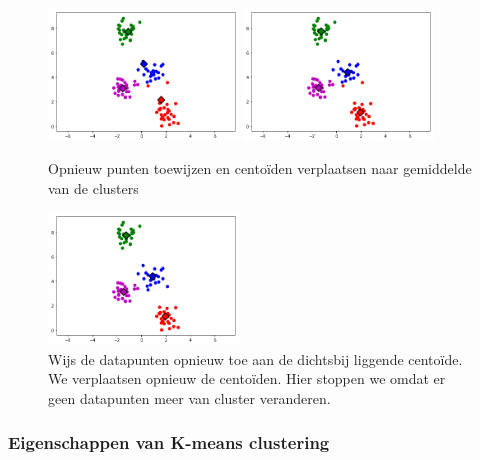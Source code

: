 \documentclass{article}
\begin{document}
\begin{figure}[H]
    \centering
    \includegraphics[width=0.45\textwidth]{k-means-7.png}
    \includegraphics[width=0.45\textwidth]{k-means-8.png}
    \caption{Opnieuw punten toewijzen en centoïden verplaatsen naar gemiddelde van de clusters}
\end{figure}

\begin{figure}[H]
    \centering
    \includegraphics[width=0.45\textwidth]{k-means-9.png}
    \caption{Wijs de datapunten opnieuw toe aan de dichtsbij liggende centoïde. We verplaatsen opnieuw de centoïden. Hier stoppen we omdat er geen datapunten meer van cluster veranderen.}
\end{figure}


\subsubsection{Eigenschappen van K-means clustering}
\end{document}
